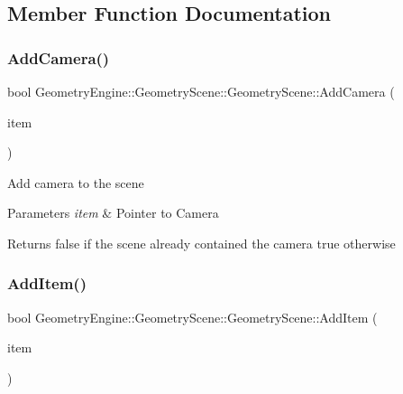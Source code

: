 \subsection{Member Function Documentation}
\mbox{\label{class_geometry_engine_1_1_geometry_scene_1_1_geometry_scene_af93678aaffba19dfb2302a9b2850ae59}} 
\subsubsection{\texorpdfstring{AddCamera()}{AddCamera()}}
{\footnotesize\ttfamily bool Geometry\+Engine\+::\+Geometry\+Scene\+::\+Geometry\+Scene\+::\+Add\+Camera (\begin{DoxyParamCaption}\item[{\mbox{\hyperlink{class_geometry_engine_1_1_geometry_world_item_1_1_geometry_camera_1_1_camera}{Geometry\+World\+Item\+::\+Geometry\+Camera\+::\+Camera}} $\ast$}]{item }\end{DoxyParamCaption})\hspace{0.3cm}{\ttfamily [virtual]}}

Add camera to the scene 
\begin{DoxyParams}{Parameters}
{\em item} & Pointer to Camera \\
\hline
\end{DoxyParams}
\begin{DoxyReturn}{Returns}
false if the scene already contained the camera true otherwise 
\end{DoxyReturn}
\mbox{\label{class_geometry_engine_1_1_geometry_scene_1_1_geometry_scene_a31a1d878b18e5e9fe4cc4aebeb3de415}} 
\subsubsection{\texorpdfstring{AddItem()}{AddItem()}}
{\footnotesize\ttfamily bool Geometry\+Engine\+::\+Geometry\+Scene\+::\+Geometry\+Scene\+::\+Add\+Item (\begin{DoxyParamCaption}\item[{\mbox{\hyperlink{class_geometry_engine_1_1_geometry_world_item_1_1_geometry_item_1_1_geometry_item}{Geometry\+World\+Item\+::\+Geometry\+Item\+::\+Geometry\+Item}} $\ast$}]{item }\end{DoxyParamCaption})\hspace{0.3cm}{\ttfamily [virtual]}}

